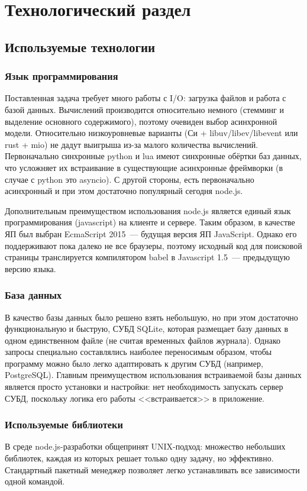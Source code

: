 \chapter{Технологический раздел}
\section{Используемые технологии}
\subsection*{Язык программирования}
Поставленная задача требует много работы с I/O: загрузка файлов и работа с базой данных. Вычислений производится относительно немного (стемминг и выделение основного содержимого), поэтому очевиден выбор асинхронной модели. Относительно низкоуровневые варианты (Си + libuv/libev/libevent или rust + mio) не дадут выигрыша из-за малого количества вычислений. Первоначально синхронные python и lua имеют синхронные обёртки баз данных, что усложняет их встраивание в существующие асинхронные фреймворки (в случае с python это asyncio). С другой стороны, есть первоначально асинхронный и при этом достаточно популярный сегодня node.js.

Дополнительным преимуществом использования node.js является единый язык программирования (javascript) на клиенте и сервере. Таким образом, в качестве ЯП был выбран EcmaScript 2015~--- будущая версия ЯП JavaScript. Однако его поддерживают  пока далеко не все браузеры, поэтому исходный код для поисковой страницы транслируется компилятором babel в Javascript 1.5~--- предыдущую версию языка.


\subsection*{База данных}
В качество базы данных было решено взять небольшую, но при этом достаточно функциональную и быструю, СУБД SQLite, которая размещает базу данных в одном единственном файле (не считая временных файлов журнала). Однако запросы специально составлялись наиболее переносимым образом, чтобы программу можно было легко адаптировать к другим СУБД (например, PostgreSQL). Главным преимуществом использования встраиваемой базы данных является просто установки и настройки: нет необходимость запускать сервер СУБД, поскольку логика его работы <<встраивается>> в приложение.


\subsection*{Используемые библиотеки}
В среде node.js-разработки общепринят UNIX-подход: множество небольших библиотек, каждая из которых решает только одну задачу, но эффективно. Стандартный пакетный менеджер позволяет легко устанавливать все зависимости одной командой.

